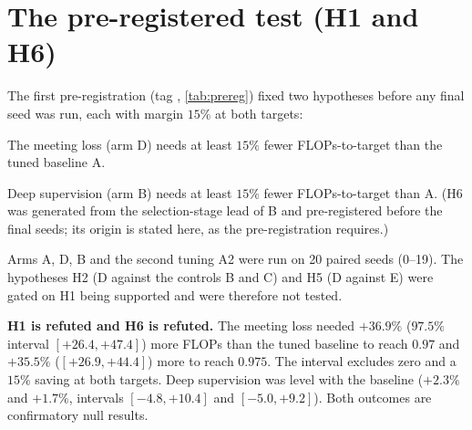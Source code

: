 \section{The pre-registered test (H1 and H6)}\label{sec:h1}
The first pre-registration (tag , \cref{tab:prereg}) fixed two hypotheses before any final seed was run, each with margin $15\%$ at both targets:
\begin{description}[leftmargin=2.6em,style=nextline]
\item[H1] The meeting loss (arm D) needs at least $15\%$ fewer FLOPs-to-target than the tuned baseline A.
\item[H6] Deep supervision (arm B) needs at least $15\%$ fewer FLOPs-to-target than A. (H6 was generated from the selection-stage lead of B and pre-registered before the final seeds; its origin is stated here, as the pre-registration requires.)
\end{description}
Arms A, D, B and the second tuning A2 were run on 20 paired seeds (0--19). The hypotheses H2 (D against the controls B and C) and H5 (D against E) were gated on H1 being supported and were therefore not tested.

\begin{table}[t]
\centering\small
\caption{Study 1, confirmatory test. Mean GFLOPs-to-target (and $95\%$ bootstrap interval of the mean), mean steps among the runs that reached the target, number of runs that never reached it, and the paired percentage change against A with a $97.5\%$ paired-bootstrap interval. 20 seeds per arm.}
\label{tab:s1-main}
\setlength{\tabcolsep}{4pt}
\end{table}

\begin{keyfinding}
\textbf{H1 is refuted and H6 is refuted.} The meeting loss needed $+36.9\%$ ($97.5\%$ interval $[+26.4,+47.4]$) more FLOPs than the tuned baseline to reach $0.97$ and $+35.5\%$ ($[+26.9,+44.4]$) more to reach $0.975$. The interval excludes zero and a $15\%$ saving at both targets. Deep supervision was level with the baseline ($+2.3\%$ and $+1.7\%$, intervals $[-4.8,+10.4]$ and $[-5.0,+9.2]$). Both outcomes are confirmatory null results.
\end{keyfinding}

